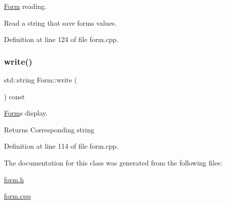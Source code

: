 \hyperlink{class_form}{Form} reading. 

Read a string that save form\textquotesingle{}s values. 

Definition at line 124 of file form.\+cpp.

\hypertarget{class_form_a5502780700cacbbf51304320cb94d88d}{}\label{class_form_a5502780700cacbbf51304320cb94d88d} 
\subsubsection{\texorpdfstring{write()}{write()}}
{\footnotesize\ttfamily std\+::string Form\+::write (\begin{DoxyParamCaption}{ }\end{DoxyParamCaption}) const}



\hyperlink{class_form}{Form}\textquotesingle{}s display. 

\begin{DoxyReturn}{Returns}
Corresponding string 
\end{DoxyReturn}


Definition at line 114 of file form.\+cpp.



The documentation for this class was generated from the following files\+:\begin{DoxyCompactItemize}
\item 
\hyperlink{form_8h}{form.\+h}\item 
\hyperlink{form_8cpp}{form.\+cpp}\end{DoxyCompactItemize}

